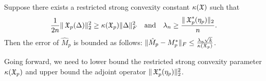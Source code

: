 


\begin{lemma}
\label{lem:lowRank}
Suppose there exists a restricted strong convexity constant $\kappa(\operatorname{\mathfrak{X}})$ such that
$$\frac{1}{2n} \| \operatorname{\mathfrak{X}}_p( \Delta )\|_2^2 \ge \kappa(\operatorname{\mathfrak{X}}_p) \|\Delta\|^2_F \quad \text{and} \quad
\lambda_n \ge \frac{\|\operatorname{\mathfrak{X}}_p^*(\eta_p)\|_2}{n}.$$
Then the error of $\hat M_p$ is bounded as follows:
$\| \hat M_p - M_p^* \|_F \le \frac{\lambda_n \sqrt{k}}{\kappa(\operatorname{\mathfrak{X}}_p)}$.
\end{lemma}

Going forward, we need to lower bound the restricted strong convexity
parameter $\kappa(\operatorname{\mathfrak{X}}_p)$ and upper bound the adjoint operator
$\|\operatorname{\mathfrak{X}}_p^*(\eta_p)\|_{2}^2$.


